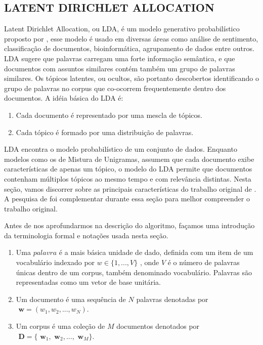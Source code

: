 \documentclass[12pt,a4paper]{article}
\begin{document}
\subsection{LATENT DIRICHLET ALLOCATION}
Latent Dirichlet Allocation, ou LDA, é um modelo generativo probabilístico proposto por , esse modelo é usado em diversas áreas como análise de sentimento, classificação de documentos, bioinformática, agrupamento de dados entre outros. LDA sugere que palavras carregam uma forte informação semântica, e que documentos com assuntos similares contém também um grupo de palavras similares. Os tópicos latentes, ou ocultos, são portanto descobertos identificando o grupo de palavras no corpus que co-ocorrem frequentemente dentro dos documentos. A idéia básica do LDA é:

\begin{enumerate}
  \item Cada documento é representado por uma mescla de tópicos.
  \item Cada tópico é formado por uma distribuição de palavras.
\end{enumerate}

LDA encontra o modelo probabilístico de um conjunto de dados. Enquanto modelos como os de Mistura de Unigramas, assumem que cada documento exibe características de apenas um tópico, o modelo do LDA  permite que documentos contenham múltiplos tópicos ao mesmo tempo e com relevância distintas. Nesta seção, vamos discorrer sobre as principais características do trabalho original de . A pesquisa de  foi complementar durante essa seção para melhor compreender o trabalho original.

Antes de nos aprofundarmos na descrição do algoritmo, façamos uma introdução da terminologia formal e notações usada nesta seção.

\begin{enumerate}
  \item Uma $palavra$ é a mais básica unidade de dado, definida com um item de um vocabulário indexado por \(w \in \{1,. . . , V\}\)  , onde $V$ é o número de palavras únicas dentro de um corpus, também denominado vocabulário. Palavras são representadas como um vetor de base unitária.
  \item Um documento é uma sequência de $N$ palavras denotadas por \(\textbf{ w} = (w_1, w_2,. . . ,  w_N)\).
  \item Um corpus é uma coleção de $M$ documentos denotados por \(\textbf{ D} = \{\textbf{ w}_1, \textbf{ w}_2, . . ., \textbf{ w}_M\}\).
\end{enumerate}
\end{document}

